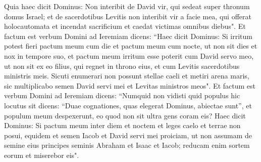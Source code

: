 \begin{biblechapter}
\verse Quia haec dicit Dominus: Non interibit de David vir, qui sedeat super thronum domus Israel; 
\verse et de sacerdotibus Levitis non interibit vir a facie mea, qui offerat holocautomata et incendat sacrificium et caedat victimas omnibus diebus". 
\verse Et factum est verbum Domini ad Ieremiam dicens: 
\verse “Haec dicit Dominus: Si irritum potest fieri pactum meum cum die et pactum meum cum nocte, ut non sit dies et nox in tempore suo, 
\verse et pactum meum irritum esse poterit cum David servo meo, ut non sit ex eo filius, qui regnet in throno eius, et cum Levitis sacerdotibus ministris meis. 
\verse Sicuti enumerari non possunt stellae caeli et metiri arena maris, sic multiplicabo semen David servi mei et Levitas ministros meos". 
\verse Et factum est verbum Domini ad Ieremiam dicens: 
\verse “Numquid non vidisti quid populus hic locutus sit dicens: “Duae cognationes, quas elegerat Dominus, abiectae sunt”, et populum meum despexerunt, eo quod non sit ultra gens coram eis? 
\verse Haec dicit Dominus: Si pactum meum inter diem et noctem et leges caelo et terrae non posui, 
\verse equidem et semen Iacob et David servi mei proiciam, ut non assumam de semine eius principes seminis Abraham et Isaac et Iacob; reducam enim sortem eorum et miserebor eis". 
\end{biblechapter}

